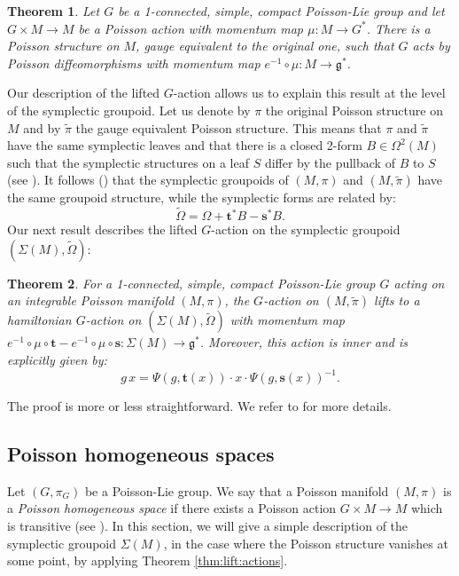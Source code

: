 \documentclass[a4paper,11pt]{amsart}
\newtheorem{thm}{Theorem}[section]
\theoremstyle{definition}
\theoremstyle{remark}
\begin{document}
\begin{thm}
Let $G$ be a  1-connected, simple, compact Poisson-Lie group and let $G\times M\to M$ be a Poisson action with
momentum map $\mu:M\to G^*$. There is a Poisson structure on $M$, gauge equivalent to the original one, such
that $G$ acts by Poisson diffeomorphisms with momentum map $e^{-1}\circ\mu:M\to{\mathfrak{g}}^*$.
\end{thm}

Our description of the lifted $G$-action allows us to explain this
result at the level of the symplectic groupoid. Let us denote by
$\pi$ the original Poisson structure on $M$ and by $\tilde{\pi}$
the gauge equivalent Poisson structure. This means that $\pi$ and
$\tilde{\pi}$ have the same symplectic leaves and that there is a
closed 2-form $B\in\Omega^2(M)$ such that the symplectic
structures on a leaf $S$ differ by the pullback of $B$ to $S$ (see
\cite{BuRa}). It follows (\cite[Theorem 4.1]{BuRa}) that the
symplectic groupoids of $(M,\pi)$ and $(M,\tilde{\pi})$ have the
same groupoid structure, while the symplectic forms are related
by:
\[ \tilde{\Omega}=\Omega+{\mathbf{t}}^*B-{\mathbf{s}}^*B.\]
Our next result describes the lifted $G$-action on the symplectic
groupoid $(\Sigma(M),\tilde{\Omega})$:

\begin{thm}
For a 1-connected, simple, compact Poisson-Lie group $G$ acting on
an integrable Poisson manifold $(M,\pi)$, the $G$-action on
$(M,\tilde{\pi})$ lifts to a hamiltonian $G$-action on
$(\Sigma(M),\tilde{\Omega})$ with momentum map
$e^{-1}\circ\mu\circ{\mathbf{t}}-e^{-1}\circ\mu\circ{\mathbf{s}}:\Sigma(M)\to{\mathfrak{g}}^*$.
Moreover, this action is inner and is explicitly given by:
\[ g\,x=\Psi(g,{\mathbf{t}}(x))\cdot x\cdot \Psi(g,{\mathbf{s}}(x))^{-1}.\]
\end{thm}

The proof is more or less straightforward. We refer to \cite{FP} for more details.

\subsection{Poisson homogeneous spaces}           \label{subsec:Poisson:homogeneous:spaces}         
Let $(G,\pi _G)$ be a Poisson-Lie group. We say that a Poisson manifold $(M,\pi )$ is a \emph{Poisson
homogeneous space} if there exists a Poisson action $G\times M\to M$ which is transitive (see \cite{D}). In this
section, we will give a simple description of the symplectic groupoid $\Sigma (M)$, in the case where the
Poisson structure vanishes at some point, by applying Theorem \ref{thm:lift:actions}.
\end{document}
